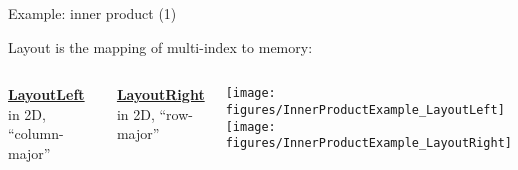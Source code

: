 
\begin{frame}[fragile]{Example: inner product (1)}

  Layout is the mapping of multi-index to memory:

  \vspace{-10pt}

  \begin{columns}[t,onlytextwidth]

      \vspace{20pt}

      \ul{\textbf{LayoutLeft}} \\
      \vspace{3pt}
      \hspace{10pt} in 2D, ``column-major''

      \vspace{50pt}

      \ul{\textbf{LayoutRight}} \\
      \vspace{3pt}
      \hspace{10pt} in 2D, ``row-major''
      \begin{center}
        \texttt{[image: figures/InnerProductExample\_LayoutLeft]}
        \\
        \vspace{10pt}
        \texttt{[image: figures/InnerProductExample\_LayoutRight]}
      \end{center}
  \end{columns}

\end{frame}


